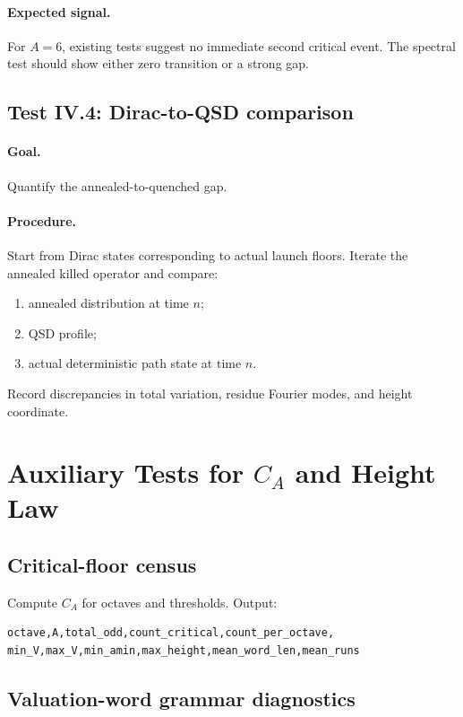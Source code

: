 \documentclass[11pt]{article}
\begin{document}
\paragraph{Expected signal.}
For $A=6$, existing tests suggest no immediate second critical event. The spectral test should show either zero transition or a strong gap.

\subsection{Test IV.4: Dirac-to-QSD comparison}

\paragraph{Goal.} Quantify the annealed-to-quenched gap.

\paragraph{Procedure.}
Start from Dirac states corresponding to actual launch floors. Iterate the annealed killed operator and compare:
\begin{enumerate}
  \item annealed distribution at time $n$;
  \item QSD profile;
  \item actual deterministic path state at time $n$.
\end{enumerate}
Record discrepancies in total variation, residue Fourier modes, and height coordinate.

\section{Auxiliary Tests for $C_A$ and Height Law}

\subsection{Critical-floor census}

Compute $C_A$ for octaves and thresholds. Output:
\begin{verbatim}
octave,A,total_odd,count_critical,count_per_octave,
min_V,max_V,min_amin,max_height,mean_word_len,mean_runs
\end{verbatim}

\subsection{Valuation-word grammar diagnostics}
\end{document}
